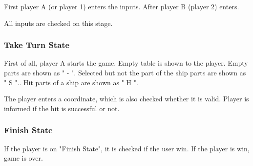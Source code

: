 \documentclass{article}
\begin{document}
		First player A (or player 1) enters the inputs. After player B (player 2) enters.

		All inputs are checked on this stage.

		\subsubsection{Take Turn State}
		First of all, player A starts the game. Empty table is shown to the player. 
		Empty parts are shown as " - ".\newline
		Selected but not the part of the ship parts are shown as " S "..\newline
		Hit parts of a ship are shown as " H ".\newline

		The player enters a coordinate, which is also checked whether it is valid.
		Player is informed if the hit is successful or not.

		\subsubsection{Finish State}
		If the player is on "Finish State", it is checked if the user win. If the player is win, game is over.
\end{document}
